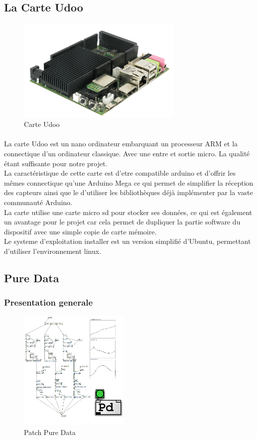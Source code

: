 \documentclass[a4paper, titlepage, oneside, 12pt]{article}%
\begin{document}
\subsection{La Carte Udoo}
\begin{figure}
  \centering
  \includegraphics[width=300px]{udoo.jpg}
  \caption{Carte Udoo}
\end{figure}

\paragraph{}
La carte Udoo est un nano ordinateur embarquant un processeur ARM et la connectique d'un ordinateur classique. Avec une entre et sortie micro. La qualité étant suffisante pour notre projet.\\
La caractéristique de cette carte est d'etre compatible arduino et d'offrir les mêmes connectique qu'une Arduino Mega ce qui permet de simplifier la réception des capteurs ainsi que le d'utiliser les bibliothèques déjà implémenter par la vaste communauté Arduino.\\
La carte utilise une carte micro sd pour stocker ses données, ce qui est également un avantage pour le projet car cela permet de dupliquer la partie software du dispositif avec une simple copie de carte mémoire.\\
Le systeme d'exploitation installer est un version simplifié d'Ubuntu, permettant d'utiliser l’environnement linux.

\subsection{Pure Data}
\subsubsection{Presentation generale}
\begin{figure}
  \centering
  \includegraphics[width=200px]{pd.jpg}
  \caption{Patch Pure Data}
\end{figure}
\end{document}
